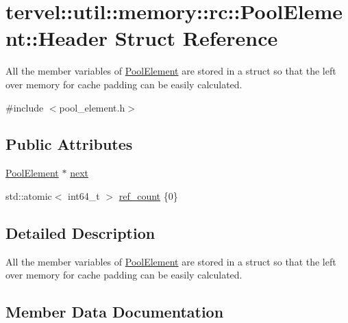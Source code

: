 \hypertarget{structtervel_1_1util_1_1memory_1_1rc_1_1_pool_element_1_1_header}{}\section{tervel\+:\+:util\+:\+:memory\+:\+:rc\+:\+:Pool\+Element\+:\+:Header Struct Reference}
\label{structtervel_1_1util_1_1memory_1_1rc_1_1_pool_element_1_1_header}


All the member variables of \hyperlink{classtervel_1_1util_1_1memory_1_1rc_1_1_pool_element}{Pool\+Element} are stored in a struct so that the left over memory for cache padding can be easily calculated.  




{\ttfamily \#include $<$pool\+\_\+element.\+h$>$}

\subsection*{Public Attributes}
\begin{DoxyCompactItemize}
\item 
\hyperlink{classtervel_1_1util_1_1memory_1_1rc_1_1_pool_element}{Pool\+Element} $\ast$ \hyperlink{structtervel_1_1util_1_1memory_1_1rc_1_1_pool_element_1_1_header_a2beae3087068869d894899bba1f1fcad}{next}
\item 
std\+::atomic$<$ int64\+\_\+t $>$ \hyperlink{structtervel_1_1util_1_1memory_1_1rc_1_1_pool_element_1_1_header_a69dc8b5b09349d7344156b80226b22bc}{ref\+\_\+count} \{0\}
\end{DoxyCompactItemize}


\subsection{Detailed Description}
All the member variables of \hyperlink{classtervel_1_1util_1_1memory_1_1rc_1_1_pool_element}{Pool\+Element} are stored in a struct so that the left over memory for cache padding can be easily calculated. 

\subsection{Member Data Documentation}
\hypertarget{structtervel_1_1util_1_1memory_1_1rc_1_1_pool_element_1_1_header_a2beae3087068869d894899bba1f1fcad}{}
